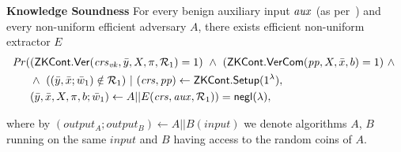 \begin{definition}[ZK Continuations]
\begin{comment}
\begin{align*}
\mathit{Pr} (& (\ZKCont.\Verify(\crsvk, \bar{y}, X, \pi, \relone) = 1  = >  \ZKCont.\Verify(\crsvk, \bar{y}, X', \pi', \relone) = 1)  \ \wedge \  \\
                   & \wedge \ (\ZKCont.\VerifyCom (\pp, X, \barx, b) = 1 => \ZKCont.\VerifyCom (\pp, X', \barx, b') = 1) \ | \\
                   & (\crs, \pp) \leftarrow \ZKCont.\Setup (1^{\lambda}), (\crspk, \crsvk) \leftarrow \ZKCont.\Gen(\crs, \relone), \\ 
                   & (\bary, \barx, X, \pi, b) \leftarrow A(\crs,\pp, \relone) \\
                   & (X', \pi', b') \leftarrow \ZKCont.\Reprove(\crspk, X, \pi, b, \relone)) = 1
\end{align*}
\end{comment}

\noindent \textbf{Knowledge Soundness} For every benign auxiliary input $\mathit{aux}$ (as per~\cite{bening_auxiliary}) and 
every non-uniform efficient adversary $A$, there exists efficient non-uniform extractor $E$  
\begin{align*}
\mathit{Pr} (& ({\mathsf{ZKCont}}.{\mathsf{Ver}}(\mathit{crs}_{\mathit{vk}}, \bar{y}, X, \pi, \mathcal{R}_1) = 1) \ \wedge \ ({\mathsf{ZKCont}}.{\mathsf{VerCom}}(\mathit{pp}, X, \bar{x}, b) = 1) \ \wedge\ \\
                   & \wedge \ ( (\bar{y}, \bar{x}; \bar{w}_1) \notin \mathcal{R}_1) \ | \ (\mathit{crs}, \mathit{pp}) \leftarrow {\ensuremath{\mathsf{ZKCont}}}.{\mathsf{Setup}} (1^{\lambda}), \\
                   & (\bar{y}, \bar{x}, X, \pi, b; \bar{w}_1 ) \leftarrow A || E (\mathit{crs}, \mathit{aux}, \mathcal{R}_1)) = \mathsf{negl} (\lambda),
\end{align*}

\begin{comment}
\begin{align*}
\mathit{Pr} (& (\ZKCont.\Verify(\crsvk, \bar{y}, X, \pi, \relone) = 1) \ \wedge \ (\ZKCont.\VerifyCom(\pp, X, \bar{x}, b) = 1) \ \wedge\ \\
                   & \wedge \ ( (\bary, \barx; \baromega_1) \notin \relone) \ | \ (\crs, \pp) \leftarrow \ZKCont.\Setup (1^{\lambda}), \\
                   & (\bary, \barx, X, \pi, b; \baromega_1 ) \leftarrow A || E (\crs, \realaux, \relone)) = \negl (\lambda),
\end{align*}
\end{comment}

\noindent %
where by $(\mathit{output_{A}};\mathit{output_{B}}) \leftarrow A || B(\mathit{input})$ we denote algorithms $A$, $B$  running on the same 
$\mathit{input}$ and $B$ having access to the random coins of $A$. \\


\end{definition}

